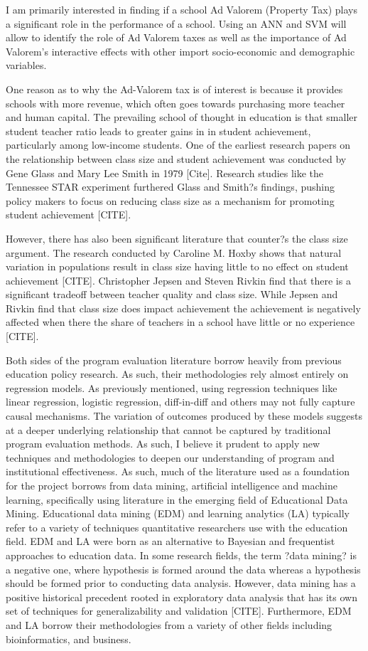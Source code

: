 \documentclass[12pt,a4paper]{article}
\begin{document}
I am primarily interested in finding if a school Ad Valorem (Property Tax) plays a significant role in the performance of a school. Using an ANN and SVM will allow to identify the role of Ad Valorem taxes as well as the importance of Ad Valorem's interactive effects with other import socio-economic and demographic variables. 

One reason as to why the Ad-Valorem tax is of interest is because it provides schools with more revenue, which often goes towards purchasing more teacher and human capital. The prevailing school of thought in education is that smaller student teacher ratio leads to greater gains in in student achievement, particularly among low-income students. One of the earliest research papers on the relationship between class size and student achievement was conducted by Gene Glass and Mary Lee Smith in 1979 [Cite]. Research studies like the Tennessee STAR experiment furthered Glass and Smith?s findings, pushing policy makers to focus on reducing class size as a mechanism for promoting student achievement [CITE]. 

However, there has also been significant literature that counter?s the class size argument. The research conducted by Caroline M. Hoxby shows that natural variation in populations result in class size having little to no effect on student achievement [CITE]. Christopher Jepsen and Steven Rivkin find that there is a significant tradeoff between teacher quality and class size. While Jepsen and Rivkin find that class size does impact achievement the achievement is negatively affected when there the share of teachers in a school have little or no experience [CITE]. 

Both sides of the program evaluation literature borrow heavily from previous education policy research. As such, their methodologies rely almost entirely on regression models. As previously mentioned, using regression techniques like linear regression, logistic regression, diff-in-diff and others may not fully capture causal mechanisms. The variation of outcomes produced by these models suggests at a deeper underlying relationship that cannot be captured by traditional program evaluation methods. As such, I believe it prudent to apply new techniques and methodologies to deepen our understanding of program and institutional effectiveness. As such, much of the literature used as a foundation for the project borrows from data mining, artificial intelligence and machine learning, specifically using literature in the emerging field of Educational Data Mining.
Educational data mining (EDM) and learning analytics (LA) typically refer to a variety of techniques quantitative researchers use with the education field. EDM and LA were born as an alternative to Bayesian and frequentist approaches to education data. In some research fields, the term ?data mining? is a negative one, where hypothesis is formed around the data whereas a hypothesis should be formed prior to conducting data analysis. However, data mining has a positive historical precedent rooted in exploratory data analysis that has its own set of techniques for generalizability and validation [CITE]. Furthermore, EDM and LA borrow their methodologies from a variety of other fields including bioinformatics, and business.
\end{document}
